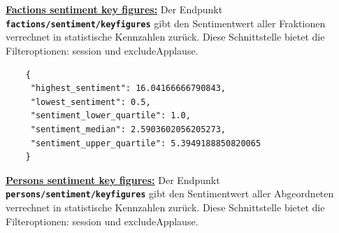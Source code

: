 \\~\\	
\textbf{\underline{Factions sentiment key figures:}} \newline
Der Endpunkt \textbf{\texttt{factions/sentiment/keyfigures}} gibt den Sentimentwert aller Fraktionen verrechnet in statistische Kennzahlen zurück. Diese Schnittstelle bietet die Filteroptionen: session und excludeApplause.	
\begin{lstlisting}
	{
	 "highest_sentiment": 16.04166666790843, 
	 "lowest_sentiment": 0.5, 
	 "sentiment_lower_quartile": 1.0, 
	 "sentiment_median": 2.5903602056205273, 
	 "sentiment_upper_quartile": 5.3949188850820065
	}
\end{lstlisting}	
\textbf{\underline{Persons sentiment key figures:}} \newline
Der Endpunkt \textbf{\texttt{persons/sentiment/keyfigures}} gibt den Sentimentwert aller Abgeordneten verrechnet in statistische Kennzahlen zurück. Diese Schnittstelle bietet die Filteroptionen: session und excludeApplause.
